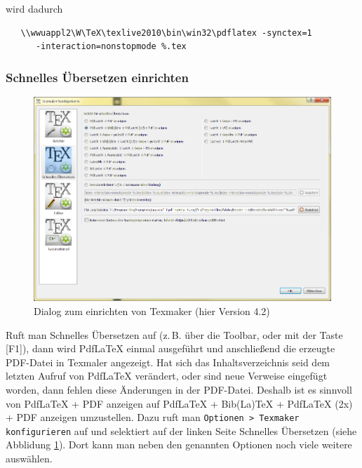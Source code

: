 wird dadurch

\begin{verbatim}
   \\wwuappl2\W\TeX\texlive2010\bin\win32\pdflatex -synctex=1
      -interaction=nonstopmode %.tex
\end{verbatim}

\subsubsection{Schnelles Übersetzen einrichten}

\begin{figure}[bh]
\includegraphics[width=\textwidth]{Bilder/Texmaker_konfigurieren2.png}
\caption{Dialog zum einrichten von Texmaker (hier Version 4.2)}
\label{texmaker_konf2}
\end{figure}

Ruft man Schnelles Übersetzen auf (z.\,B. über die Toolbar, oder mit der Taste [F1]), dann wird PdfLaTeX einmal ausgeführt und anschließend die erzeugte PDF-Datei in Texmaler angezeigt. Hat sich das Inhaltsverzeichnis seid dem letzten Aufruf von PdfLaTeX verändert, oder sind neue Verweise eingefügt worden, dann fehlen diese Änderungen in der PDF-Datei. Deshalb ist es sinnvoll von  PdfLaTeX + PDF anzeigen auf PdfLaTeX + Bib(La)TeX + PdfLaTeX (2x) + PDF anzeigen umzustellen. Dazu ruft man \verb+Optionen > Texmaker konfigurieren+ auf und selektiert auf der linken Seite Schnelles Übersetzen (siehe Abblidung \ref{texmaker_konf2}). Dort kann man neben den genannten Optionen noch viele weitere auswählen.

